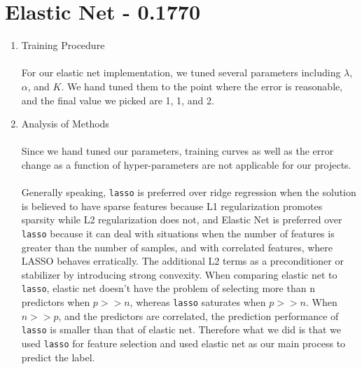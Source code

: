 \documentclass[english]{article}
\begin{document}
\section{Elastic Net - 0.1770}
\begin{enumerate}
\item Training Procedure\\\\
For our elastic net implementation, we tuned several parameters including $\lambda$, $\alpha$, and $K$. We hand tuned them to the point where the error is reasonable, and the final value we picked are 1, 1, and 2.\\
\item Analysis of Methods\\\\
Since we hand tuned our parameters, training curves as well as the error change as a function of hyper-parameters are not applicable for our projects.\\\\
Generally speaking, \texttt{lasso} is preferred over ridge regression when the solution is believed to have sparse features because L1 regularization promotes sparsity while L2 regularization does not, and Elastic Net is preferred over \texttt{lasso} because it can deal with situations when the number of features is greater than the number of samples, and with correlated features, where LASSO behaves erratically. The additional L2 terms as a preconditioner or stabilizer by introducing strong convexity. When comparing elastic net to \texttt{lasso}, elastic net doesn't have the problem of selecting more than n predictors when $p >> n$, whereas \texttt{lasso} saturates when $p >> n$. When $n >> p$, and the predictors are correlated, the prediction performance of \texttt{lasso} is smaller than that of elastic net. Therefore what we did is that we used \texttt{lasso} for feature selection and used elastic net as our main process to predict the label.
\end{enumerate}
\end{document}
